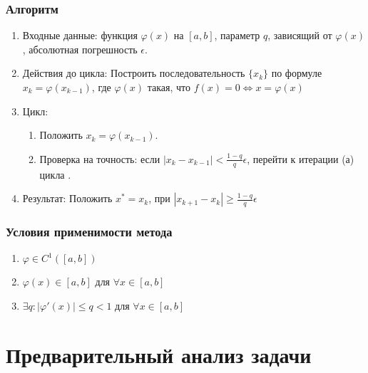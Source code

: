 \documentclass{article}
\begin{document}
	\subsubsection{Алгоритм}
	\begin{enumerate}
		\item Входные данные: функция $\varphi(x)$ на $[a, b]$, параметр $q$, зависящий от $\varphi(x)$, абсолютная погрешность $\epsilon$.
		\item Действия до цикла:
		Построить последовательность $\{x_k\}$ по формуле  $x_k = \varphi(x_{k-1})$, где $\varphi(x)$ такая, что $f(x) = 0 \iff x = \varphi(x)$
		\item Цикл: 
		\begin{enumerate}
			\item Положить $x_k = \varphi(x_{k-1})$.  
			\item Проверка на точность: если $|x_k-x_{k-1}| < \frac{1-q}{q}\epsilon$, перейти к итерации (а) цикла .
		\end{enumerate}
		\item Результат: Положить $x^*=x_k$, при $|x_{k+1}-x_k| \geq \frac{1-q}{q}\epsilon$
	\end{enumerate}
	\subsubsection{Условия применимости метода}
	\begin{enumerate}
		\item $\varphi \in C^1([a, b])$
		\item $\varphi(x)\in [a, b]$ для $\forall x \in [a, b]$
		\item $\exists q: |\varphi'(x)|\leq q<1$ для $\forall x \in [a, b]$
	\end{enumerate}
	\section{Предварительный анализ задачи}
\end{document}
